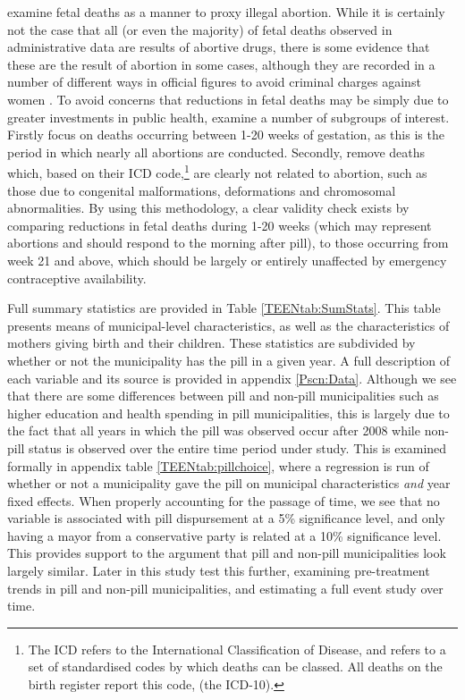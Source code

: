 \Person examine fetal deaths as a manner to proxy illegal abortion.  While it 
is certainly not the case that all (or even the majority) of fetal deaths 
observed in administrative data are results of abortive drugs, there is some
evidence that these are the result of abortion in some cases, although they are 
recorded in a number of different ways in official figures to avoid criminal 
charges against women \citep{ShepardCasas2007}.  To avoid concerns that 
reductions in fetal deaths may be simply due to greater investments in public
health, \person examine a number of subgroups of interest.  Firstly \person focus 
on deaths occurring between 1-20 weeks of gestation, as this is the period in 
which nearly all abortions are conducted.  Secondly, \person remove deaths which,
based on their ICD code,\footnote{The ICD refers to the International 
Classification of Disease, and refers to a set of standardised codes by which
deaths can be classed.  All deaths on the birth register report this code,
(the ICD-10).} are clearly not related to abortion, such as those due to 
congenital malformations, deformations and chromosomal abnormalities.  By
using this methodology, a clear validity check exists by comparing reductions
in fetal deaths during 1-20 weeks (which may represent abortions and should
respond to the morning after pill), to those occurring from week 21 and above,
which should be largely or entirely unaffected by emergency contraceptive
availability.

Full summary statistics are provided in Table \ref{TEENtab:SumStats}. This table
presents means of municipal-level characteristics, as well as the 
characteristics of mothers giving birth and their children.  These statistics 
are subdivided by whether or not the municipality has the pill in a given year.  
A full description of each variable and its source is provided in appendix 
\ref{Pscn:Data}. Although we see that there are some differences between pill 
and non-pill municipalities such as higher education and health spending in pill 
municipalities, this is largely due to the fact that all years in which the pill 
was observed occur after 2008 while non-pill status is observed over the entire 
time period under study.  This is examined formally in appendix table 
\ref{TEENtab:pillchoice}, where a regression is run of whether or not a 
municipality gave the pill on municipal characteristics \emph{and} year fixed
effects.  When properly accounting for the passage of time, we see that no 
variable is associated with pill dispursement at a 5\% significance level, and
only having a mayor from a conservative party is related at a 10\% significance
level.  This provides support to the argument that pill and non-pill 
municipalities look largely similar.  Later in this study \person test this 
further, examining pre-treatment trends in pill and non-pill municipalities, and
estimating a full event study over time.

